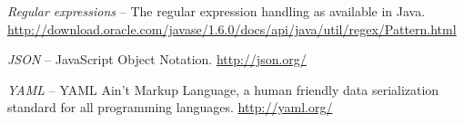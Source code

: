 \begin{thebibliography}{999}
		\textit{Regular expressions} -- The regular expression handling as available
		in Java.
		\url{http://download.oracle.com/javase/1.6.0/docs/api/java/util/regex/Pattern.html}{}

		\textit{JSON} -- JavaScript Object Notation.
		\url{http://json.org/}{}

		\textit{YAML} -- YAML Ain't Markup Language, a human friendly
		data serialization standard for all programming languages.
		\url{http://yaml.org/}{}

\end{thebibliography}
